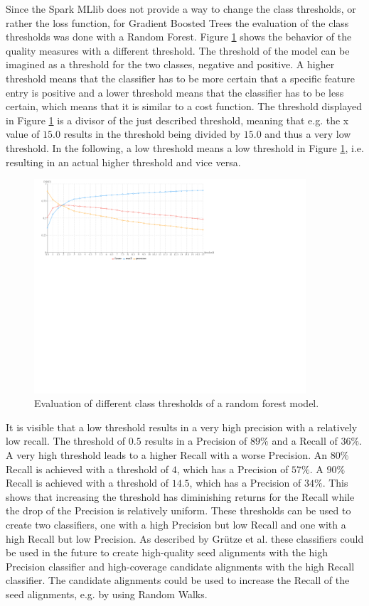 Since the Spark MLlib does not provide a way to change the class thresholds, or rather the loss function, for Gradient Boosted Trees the evaluation of the class thresholds was done with a Random Forest. Figure \ref{rf_thresh_large} shows the behavior of the quality measures with a different threshold. The threshold of the model can be imagined as a threshold for the two classes, negative and positive. A higher threshold means that the classifier has to be more certain that a specific feature entry is positive and a lower threshold means that the classifier has to be less certain, which means that it is similar to a cost function. The threshold displayed in Figure \ref{rf_thresh_large} is a divisor of the just described threshold, meaning that e.g. the x value of $15.0$ results in the threshold being divided by $15.0$ and thus a very low threshold. In the following, a low threshold means a low threshold in Figure \ref{rf_thresh_large}, i.e. resulting in an actual higher threshold and vice versa.\par
\begin{figure}[H]
	\centering
	\includegraphics[width=0.9\textwidth]{img/rf_thresh_large}
	\caption{Evaluation of different class thresholds of a random forest model.}
	\label{rf_thresh_large}
\end{figure}
It is visible that a low threshold results in a very high precision with a relatively low recall. The threshold of $0.5$ results in a Precision of $89\%$ and a Recall of $36\%$. A very high threshold leads to a higher Recall with a worse Precision. An $80\%$ Recall is achieved with a threshold of $4$, which has a Precision of $57\%$. A $90\%$ Recall is achieved with a threshold of $14.5$, which has a Precision of $34\%$. This shows that increasing the threshold has diminishing returns for the Recall while the drop of the Precision is relatively uniform. These thresholds can be used to create two classifiers, one with a high Precision but low Recall and one with a high Recall but low Precision. As described by Grütze et al. \cite{coheel} these classifiers could be used in the future to create high-quality seed alignments with the high Precision classifier and high-coverage candidate alignments with the high Recall classifier. The candidate alignments could be used to increase the Recall of the seed alignments, e.g. by using Random Walks.



